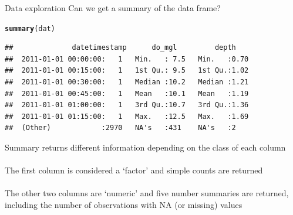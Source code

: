 \documentclass[xcolor=svgnames]{beamer}\usepackage[]{graphicx}\usepackage[]{color}
\makeatletter
\newcommand{\hlstd}[1]{\textcolor[rgb]{0.345,0.345,0.345}{#1}}%
\newcommand{\hlkwd}[1]{\textcolor[rgb]{0.737,0.353,0.396}{\textbf{#1}}}%
\newenvironment{kframe}{%
 \def\at@end@of@kframe{}%
 \ifinner\ifhmode%
  \def\at@end@of@kframe{\end{minipage}}%
  \begin{minipage}{\columnwidth}%
 \fi\fi%
 \def\FrameCommand##1{\hskip\@totalleftmargin \hskip-\fboxsep
 \colorbox{shadecolor}{##1}\hskip-\fboxsep
     \hskip-\linewidth \hskip-\@totalleftmargin \hskip\columnwidth}%
 \MakeFramed {\advance\hsize-\width
   \@totalleftmargin\z@ \linewidth\hsize
   \@setminipage}}%
 {\par\unskip\endMakeFramed%
 \at@end@of@kframe}
\newenvironment{knitrout}{}{} %
\makeatother
\begin{document}
\begin{frame}[fragile]{Data exploration}
Can we get a summary of the data frame?
\pause
\begin{knitrout}\scriptsize
{}\color{fgcolor}\begin{kframe}
\begin{alltt}
\hlkwd{summary}\hlstd{(dat)}
\end{alltt}
\begin{verbatim}
##              datetimestamp      do_mgl         depth     
##  2011-01-01 00:00:00:   1   Min.   : 7.5   Min.   :0.70  
##  2011-01-01 00:15:00:   1   1st Qu.: 9.5   1st Qu.:1.02  
##  2011-01-01 00:30:00:   1   Median :10.2   Median :1.21  
##  2011-01-01 00:45:00:   1   Mean   :10.1   Mean   :1.19  
##  2011-01-01 01:00:00:   1   3rd Qu.:10.7   3rd Qu.:1.36  
##  2011-01-01 01:15:00:   1   Max.   :12.5   Max.   :1.69  
##  (Other)            :2970   NA's   :431    NA's   :2
\end{verbatim}
\end{kframe}
\end{knitrout}
Summary returns different information depending on the class of each column\\~\\
The first column is considered a `factor' and simple counts are returned\\~\\
The other two columns are `numeric' and five number summaries are returned, including the number of observations with NA (or missing) values
\end{frame}
\end{document}
